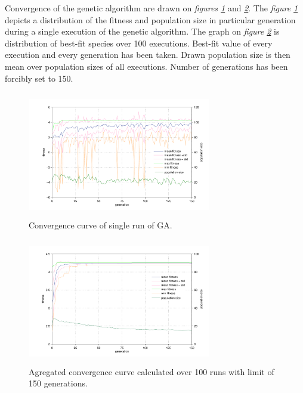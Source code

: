 \documentclass[a4paper,jurnal]{IEEEtran}
\begin{document}
Convergence of the genetic algorithm are drawn on \textit{figures \ref{fig:conv_curve_s}} and  \textit{\ref{fig:conv_curve}}.
The \textit{figure \ref{fig:conv_curve_s}} depicts a distribution of the fitness and population size
in particular generation during a single execution of the genetic algorithm.
The graph on \textit{figure \ref{fig:conv_curve}} is distribution of best-fit species over 100 executions.
Best-fit value of every execution and every generation has been taken. Drawn population size 
is then mean over population sizes of all executions. Number of generations has been forcibly set to 150.


\begin{figure}[h]
	\centering
	\includegraphics[width=80mm,height=55mm]{ga_conv_curve_s}
	\caption{Convergence curve of single run of GA.}
	\label{fig:conv_curve_s}
\end{figure}
\begin{figure}[h]
	\centering
	\includegraphics[width=80mm,height=55mm]{ga_conv_curve}
	\caption{Agregated convergence curve calculated over 100 runs with limit of 150 generations.}
	\label{fig:conv_curve}
\end{figure}
\end{document}
